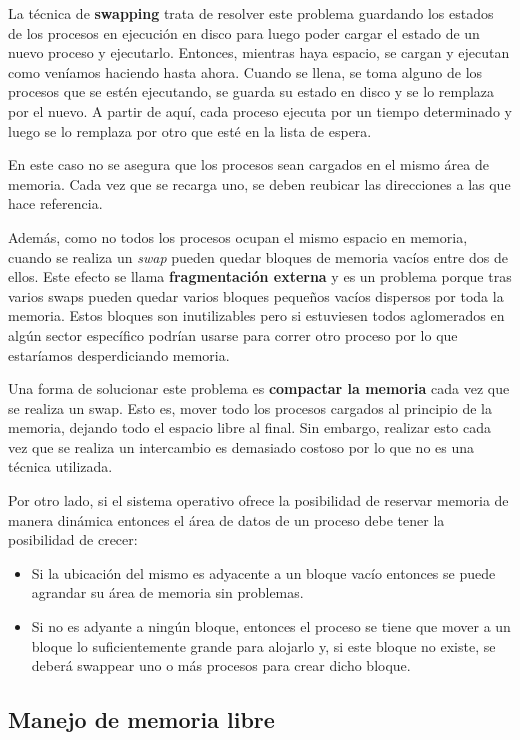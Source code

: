 La técnica de \textbf{swapping} trata de resolver este problema guardando los estados de los procesos en ejecución en disco para luego poder cargar el estado de un nuevo proceso y ejecutarlo. Entonces, mientras haya espacio, se cargan y ejecutan como veníamos haciendo hasta ahora. Cuando se llena, se toma alguno de los procesos que se estén ejecutando, se guarda su estado en disco y se lo remplaza por el nuevo. A partir de aquí, cada proceso ejecuta por un tiempo determinado y luego se lo remplaza por otro que esté en la lista de espera.

En este caso no se asegura que los procesos sean cargados en el mismo área de memoria. Cada vez que se recarga uno, se deben reubicar las direcciones a las que hace referencia. 

Además, como no todos los procesos ocupan el mismo espacio en memoria, cuando se realiza un \textit{swap} pueden quedar bloques de memoria vacíos entre dos de ellos. Este efecto se llama \textbf{fragmentación externa} y es un problema porque tras varios swaps pueden quedar varios bloques pequeños vacíos dispersos por toda la memoria. Estos bloques son inutilizables pero si estuviesen todos aglomerados en algún sector específico podrían usarse para correr otro proceso por lo que estaríamos desperdiciando memoria.

Una forma de solucionar este problema es \textbf{compactar la memoria} cada vez que se realiza un swap. Esto es, mover todo los procesos cargados al principio de la memoria, dejando todo el espacio libre al final. Sin embargo, realizar esto cada vez que se realiza un intercambio es demasiado costoso por lo que no es una técnica utilizada.

Por otro lado, si el sistema operativo ofrece la posibilidad de reservar memoria de manera dinámica entonces el área de datos de un proceso debe tener la posibilidad de crecer:
\begin{itemize}
	\item Si la ubicación del mismo es adyacente a un bloque vacío entonces se puede agrandar su área de memoria sin problemas.
	\item Si no es adyante a ningún bloque, entonces el proceso se tiene que mover a un bloque lo suficientemente grande para alojarlo y, si este bloque no existe, se deberá swappear uno o más procesos para crear dicho bloque.
\end{itemize}

\subsection{Manejo de memoria libre}

